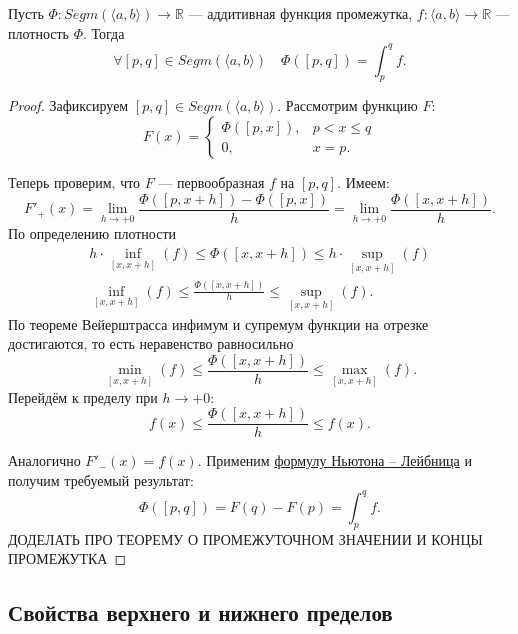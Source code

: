 \begin{theorem}
	Пусть \(\Phi \colon Segm(\langle a, b \rangle) \to \mathbb{R}\) --- аддитивная функция промежутка, \(f \colon \langle a, b \rangle \to \mathbb{R}\) --- плотность \(\Phi\). Тогда \[
		\forall [p, q] \in Segm(\langle a, b \rangle) \quad \Phi([p, q]) = \int_p^q f.
	\]
\end{theorem}

\begin{proof}
	Зафиксируем \([p, q] \in Segm(\langle a, b \rangle)\). Рассмотрим функцию \(F\): \[
		F(x) =
		\begin{cases}
			\Phi([p, x]), & p < x \leqslant q \\
			0,			  & x = p.
		\end{cases}
	\]
	
	Теперь проверим, что \(F\) --- первообразная \(f\) на \([p, q]\). Имеем: \[
		F'_+(x) = \lim_{h \to +0} \frac{\Phi([p, x + h]) - \Phi([p, x])}{h} = \lim_{h \to +0} \frac{\Phi([x, x + h])}{h}.
	\]
	По определению плотности
	\begin{gather*}
		h \cdot \inf_{[x, x + h]}(f) \leqslant \Phi([x, x + h]) \leqslant h \cdot \sup_{[x, x + h]}(f) \\
		\inf_{[x, x + h]}(f) \leqslant \frac{\Phi([x, x + h])}{h} \leqslant \sup_{[x, x + h]}(f).
	\end{gather*}
	По теореме Вейерштрасса инфимум и супремум функции на отрезке достигаются, то есть неравенство равносильно \[
		\min_{[x, x + h]}(f) \leqslant \frac{\Phi([x, x + h])}{h} \leqslant \max_{[x, x + h]}(f).
	\]
	Перейдём к пределу при \(h \to +0\): \[
		f(x) \leqslant \frac{\Phi([x, x + h])}{h} \leqslant f(x).
	\]
	
	Аналогично \(F'_-(x) = f(x)\). Применим \hyperlink{Newton}{формулу Ньютона -- Лейбница} и получим требуемый результат: \[
		\Phi([p, q]) = F(q) - F(p) = \int_p^q f.
	\]
	ДОДЕЛАТЬ ПРО ТЕОРЕМУ О ПРОМЕЖУТОЧНОМ ЗНАЧЕНИИ И КОНЦЫ ПРОМЕЖУТКА
\end{proof}

\subsection{Свойства верхнего и нижнего пределов}

